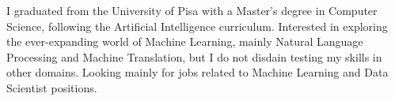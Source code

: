 
\begin{cvparagraph}

I graduated from the University of Pisa with a Master's degree in Computer Science, following the Artificial Intelligence curriculum. Interested in exploring the ever-expanding world of Machine Learning, mainly Natural Language Processing and Machine Translation, but I do not disdain testing my skills in other domains. Looking mainly for jobs related to Machine Learning and Data Scientist positions.
\end{cvparagraph}
